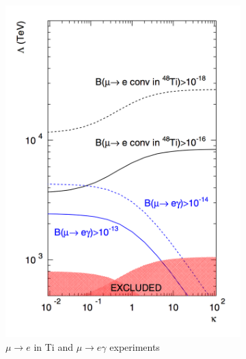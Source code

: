 \begin{figure}[htbp]
  \centering
    \begin{subfigure}[t]{0.49\textwidth}
      \includegraphics[width=\textwidth]{images/clfv_type1.png}
      \caption{\( \mu\rightarrow e \) in Ti and \( \mu\rightarrow e\gamma \) experiments}
    \end{subfigure}
    \begin{subfigure}[t]{0.49\textwidth}

\end{subfigure}
\end{figure}
